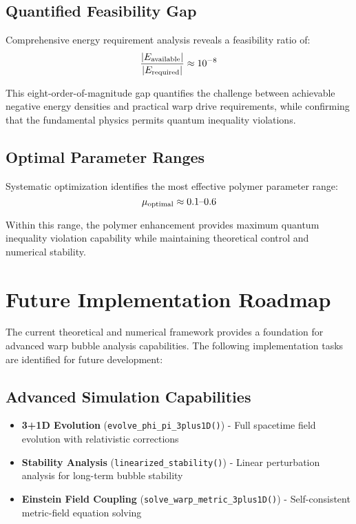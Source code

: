 \documentclass[11pt]{article}
\begin{document}
\subsection{Quantified Feasibility Gap}
Comprehensive energy requirement analysis reveals a feasibility ratio of:
\begin{equation}
\frac{|E_{\rm available}|}{|E_{\rm required}|} \approx 10^{-8}
\end{equation}

This eight-order-of-magnitude gap quantifies the challenge between achievable negative energy densities and practical warp drive requirements, while confirming that the fundamental physics permits quantum inequality violations.

\subsection{Optimal Parameter Ranges}
Systematic optimization identifies the most effective polymer parameter range:
\begin{equation}
\mu_{\rm optimal} \approx 0.1 \text{--} 0.6
\end{equation}

Within this range, the polymer enhancement provides maximum quantum inequality violation capability while maintaining theoretical control and numerical stability.

\section{Future Implementation Roadmap}

The current theoretical and numerical framework provides a foundation for advanced warp bubble analysis capabilities. The following implementation tasks are identified for future development:

\subsection{Advanced Simulation Capabilities}
\begin{itemize}
\item \textbf{3+1D Evolution} (\texttt{evolve\_phi\_pi\_3plus1D()}) - Full spacetime field evolution with relativistic corrections
\item \textbf{Stability Analysis} (\texttt{linearized\_stability()}) - Linear perturbation analysis for long-term bubble stability
\item \textbf{Einstein Field Coupling} (\texttt{solve\_warp\_metric\_3plus1D()}) - Self-consistent metric-field equation solving
\end{itemize}
\end{document}
